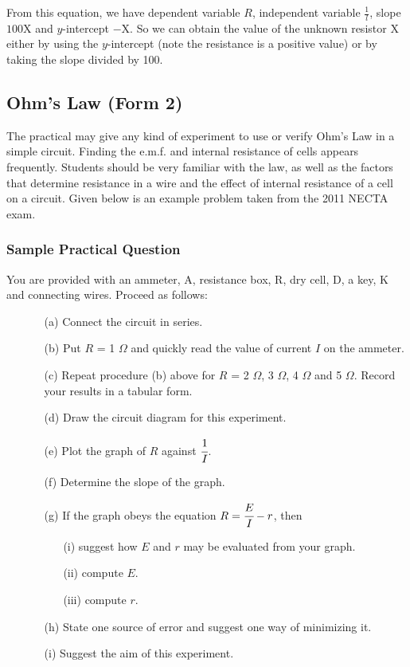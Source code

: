 From this equation, we have dependent variable $R$, independent variable $\frac{1}{l}$, slope $100 \text{X}$ and $y$-intercept $-\text{X}$. So we can obtain the value of the unknown resistor X either by using the $y$-intercept (note the resistance is a positive value) or by taking the slope divided by 100.

\subsection{Ohm’s Law (Form 2)}

The practical may give any kind of experiment to use or verify Ohm’s Law in a
simple circuit. Finding the e.m.f. and internal resistance of cells appears frequently. Students should be very familiar with the law, as well as the factors that determine resistance in a wire and the effect of internal resistance of a cell on a circuit. Given below is an example problem taken from the 2011 NECTA exam.

\subsubsection{Sample Practical Question}
You are provided with an ammeter, A, resistance box, R, dry cell, D, a key, K and connecting wires. Proceed as follows:
\begin{enumerate}
\item[]
\begin{enumerate}
\item[(a)] Connect the circuit in series.
\item[(b)] Put $R$ = 1 $\Omega$ and quickly read the value of current $I$ on the ammeter.
\item[(c)] Repeat procedure (b) above for $R$ = 2 $\Omega$, 3 $\Omega$, 4 $\Omega$ and 5 $\Omega$. Record your results in a tabular form.
\item[(d)] Draw the circuit diagram for this experiment.
\item[(e)] Plot the graph of $R$ against $\cfrac{1}{I}$.
\item[(f)] Determine the slope of the graph.
\item[(g)] If the graph obeys the equation $R=\cfrac{E}{I}-r$, then
\begin{enumerate}
\item[(i)] suggest how $E$ and $r$ may be evaluated from your graph.
\item[(ii)] compute $E$.
\item[(iii)] compute $r$.
\end{enumerate}
\item[(h)] State one source of error and suggest one way of minimizing it.
\item[(i)] Suggest the aim of this experiment.
\end{enumerate}
\end{enumerate}

